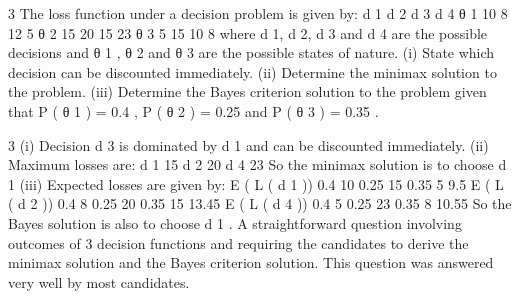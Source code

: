 \documentclass[a4paper,12pt]{article}
\begin{document}
3 The loss function under a decision problem is given by:
d 1
d 2
d 3
d 4
θ 1
10
8
12
5
θ 2
15
20
15
23
θ 3
5
15
10
8
where d 1, d 2, d 3 and d 4 are the possible decisions and θ 1 , θ 2 and θ 3 are the possible
states of nature.
(i) State which decision can be discounted immediately. 
(ii) Determine the minimax solution to the problem. 
(iii) Determine the Bayes criterion solution to the problem given that P ( θ 1 ) = 0.4 ,
P ( θ 2 ) = 0.25 and P ( θ 3 ) = 0.35 .

3
(i) Decision d 3 is dominated by d 1 and can be discounted immediately.
(ii) Maximum losses are:
d 1 15
d 2 20
d 4 23
So the minimax solution is to choose d 1
(iii) Expected losses are given by:
E ( L ( d 1 )) 0.4 10 0.25 15 0.35 5 9.5
E ( L ( d 2 )) 0.4 8 0.25 20 0.35 15 13.45
E ( L ( d 4 )) 0.4 5 0.25 23 0.35 8 10.55
So the Bayes solution is also to choose d 1 .
A straightforward question involving outcomes of 3 decision functions and requiring
the candidates to derive the minimax solution and the Bayes criterion solution. This
question was answered very well by most candidates.
\end{document}
